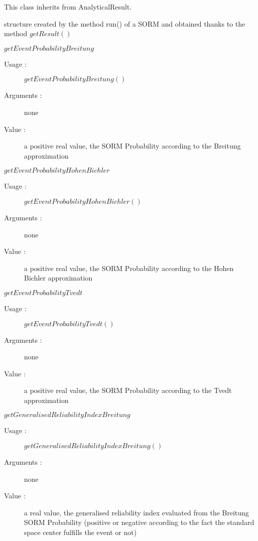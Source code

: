 This class inherits from AnalyticalResult.

\begin{description}

\item[Usage :] structure created by the method run() of a SORM and obtained thanks to the method $getResult()$

\item[Some methods :]  \rule{0pt}{1em}

  \begin{description}

  \item $getEventProbabilityBreitung$
    \begin{description}
    \item[Usage :] $getEventProbabilityBreitung()$
    \item[Arguments :] none
    \item[Value :]  a positive real value, the SORM Probability according to the Breitung approximation
    \end{description}
    \bigskip

  \item $getEventProbabilityHohenBichler$
    \begin{description}
    \item[Usage :] $getEventProbabilityHohenBichler()$
    \item[Arguments :] none
    \item[Value :]  a positive real value, the SORM Probability according to the Hohen Bichler approximation
    \end{description}
    \bigskip

  \item $getEventProbabilityTvedt$
    \begin{description}
    \item[Usage :] $getEventProbabilityTvedt()$
    \item[Arguments :] none
    \item[Value :]  a positive real value, the SORM Probability according to the Tvedt approximation
    \end{description}
    \bigskip

  \item $getGeneralisedReliabilityIndexBreitung$
    \begin{description}
    \item[Usage :] $getGeneralisedReliabilityIndexBreitung()$
    \item[Arguments :] none
    \item[Value :]  a  real value, the generalised reliability index evaluated from the Breitung SORM Probability (positive or negative according to the fact the standard space center fulfills the event or not)
    \end{description}
    \bigskip


\end{description}
\end{description}
